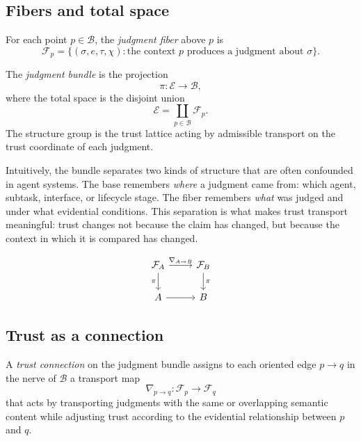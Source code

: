 \documentclass[11pt]{article}
\newcommand{\Bundle}{\mathcal{E}}
\newcommand{\Base}{\mathcal{B}}
\newcommand{\Fiber}{\mathcal{F}}
\newcommand{\Conn}{\nabla}
\newcommand{\Claim}{\sigma}
\newcommand{\Evidence}{e}
\newcommand{\Channel}{\chi}
\newcommand{\TrustVar}{\tau}
\begin{document}
\subsection{Fibers and total space}

\begin{definition}
For each point $p \in \Base$, the \emph{judgment fiber} above $p$ is
\[
  \Fiber_p = \{ (\Claim, \Evidence, \TrustVar, \Channel) :
  \text{the context } p \text{ produces a judgment about } \Claim \}.
\]
\end{definition}

\begin{definition}
The \emph{judgment bundle} is the projection
\[
  \pi : \Bundle \to \Base,
\]
where the total space is the disjoint union
\[
  \Bundle = \coprod_{p \in \Base} \Fiber_p.
\]
The structure group is the trust lattice acting by admissible transport on the
trust coordinate of each judgment.
\end{definition}

Intuitively, the bundle separates two kinds of structure that are often
confounded in agent systems.  The base remembers \emph{where} a judgment came
from: which agent, subtask, interface, or lifecycle stage.  The fiber remembers
\emph{what} was judged and under what evidential conditions.  This separation is
what makes trust transport meaningful: trust changes not because the claim has
changed, but because the context in which it is compared has changed.

\begin{equation}
\begin{tikzcd}
\Fiber_A \arrow[r, "\Conn_{A\to B}"] \arrow[d, "\pi"'] & \Fiber_B \arrow[d, "\pi"] \\
A \arrow[r] & B
\end{tikzcd}
\end{equation}

\subsection{Trust as a connection}

\begin{definition}
A \emph{trust connection} on the judgment bundle assigns to each oriented edge
$p \to q$ in the nerve of $\Base$ a transport map
\[
  \Conn_{p\to q} : \Fiber_p \to \Fiber_q
\]
that acts by transporting judgments with the same or overlapping semantic
content while adjusting trust according to the evidential relationship between
$p$ and $q$.
\end{definition}
\end{document}
